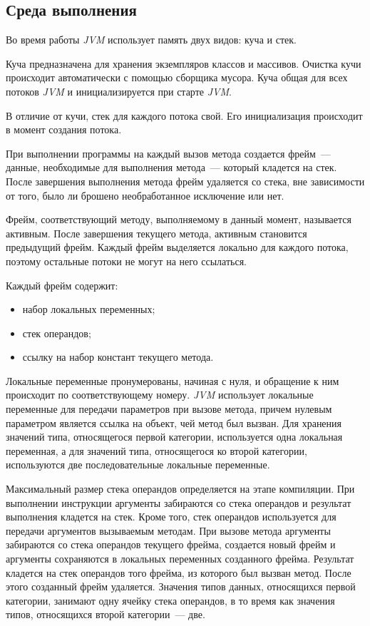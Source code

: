 \subsection{Среда выполнения}
\label{jvm_env}
Во время работы \textit{JVM} использует память двух видов: куча и стек.

Куча предназначена для хранения экземпляров классов и массивов. Очистка кучи происходит автоматически с помощью сборщика мусора. Куча общая для всех потоков 
\textit{JVM} и инициализируется при старте \textit{JVM}.

В отличие от  кучи, стек для каждого потока свой. Его инициализация происходит в момент создания потока.

При выполнении программы на каждый вызов метода создается фрейм~--- данные, необходимые для выполнения метода~--- который кладется на стек. После завершения 
выполнения метода фрейм удаляется со стека, вне зависимости от того, было ли брошено необработанное исключение или нет.

Фрейм, соответствующий методу, выполняемому в данный момент, называется активным. После завершения текущего метода, активным становится предыдущий фрейм. 
Каждый фрейм выделяется локально для каждого потока, поэтому остальные потоки не могут на него ссылаться.

Каждый фрейм содержит:
\begin{itemize}
 \item набор локальных переменных;
 \item стек операндов;
 \item ссылку на набор констант текущего метода.
\end{itemize}

Локальные переменные пронумерованы, начиная с нуля, и обращение к ним происходит по соответствующему номеру. \textit{JVM} использует локальные переменные для 
передачи параметров при вызове метода, причем нулевым параметром является ссылка на объект, чей метод был вызван. Для хранения значений типа, относящегося 
первой категории, используется одна локальная переменная, а для значений типа, относящегося ко второй категории, используются две последовательные локальные 
переменные.

Максимальный размер стека операндов определяется на этапе компиляции. При выполнении инструкции аргументы забираются со стека операндов и результат выполнения 
кладется на стек. Кроме того, стек операндов используется для передачи аргументов вызываемым методам. При вызове метода аргументы забираются со стека операндов 
текущего фрейма, создается новый фрейм и аргументы сохраняются в локальных переменных созданного фрейма. Результат кладется на стек операндов того фрейма, из 
которого был вызван метод. После этого созданный фрейм удаляется. Значения типов данных, относящихся первой категории, занимают одну ячейку стека операндов, в 
то время как значения типов, относящихся второй категории~--- две.

